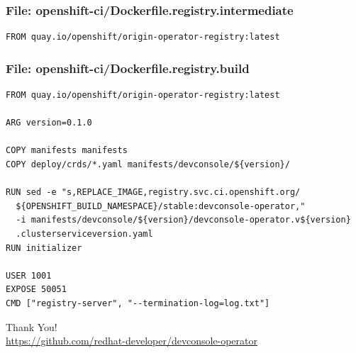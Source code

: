 \documentclass[aspectratio=169]{beamer}
\begin{document}
\begin{frame}[fragile]
  \frametitle{File: openshift-ci/Dockerfile.registry.intermediate}

  \begin{Verbatim}[fontsize=\small]
FROM quay.io/openshift/origin-operator-registry:latest
  \end{Verbatim}
\end{frame}

\begin{frame}[fragile]
  \frametitle{File: openshift-ci/Dockerfile.registry.build}

  \begin{Verbatim}[fontsize=\small]
FROM quay.io/openshift/origin-operator-registry:latest

ARG version=0.1.0

COPY manifests manifests
COPY deploy/crds/*.yaml manifests/devconsole/${version}/

RUN sed -e "s,REPLACE_IMAGE,registry.svc.ci.openshift.org/
  ${OPENSHIFT_BUILD_NAMESPACE}/stable:devconsole-operator,"
  -i manifests/devconsole/${version}/devconsole-operator.v${version}
  .clusterserviceversion.yaml
RUN initializer

USER 1001
EXPOSE 50051
CMD ["registry-server", "--termination-log=log.txt"]
  \end{Verbatim}
\end{frame}

\begin{frame}
  \begin{center}
    {\huge Thank You!}\\[1cm]
    \url{https://github.com/redhat-developer/devconsole-operator}
  \end{center}
\end{frame}
\end{document}
